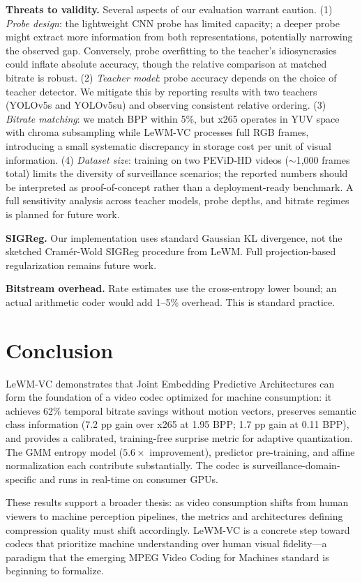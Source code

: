 \documentclass{article}
\begin{document}
\textbf{Threats to validity.} Several aspects of our evaluation warrant caution.
(1) \textit{Probe design}: the lightweight CNN probe has limited capacity; a deeper
probe might extract more information from both representations, potentially
narrowing the observed gap. Conversely, probe overfitting to the teacher's
idiosyncrasies could inflate absolute accuracy, though the relative comparison
at matched bitrate is robust. (2) \textit{Teacher model}: probe accuracy depends on
the choice of teacher detector. We mitigate this by reporting results with two
teachers (YOLOv5s and YOLOv5su) and observing consistent relative ordering.
(3) \textit{Bitrate matching}: we match BPP within 5\%, but x265 operates in
YUV space with chroma subsampling while LeWM-VC processes full RGB frames,
introducing a small systematic discrepancy in storage cost per unit of visual
information. (4) \textit{Dataset size}: training on two PEViD-HD videos (${\sim}$1,000
frames total) limits the diversity of surveillance scenarios; the reported
numbers should be interpreted as proof-of-concept rather than a deployment-ready
benchmark. A full sensitivity analysis across teacher models, probe depths, and
bitrate regimes is planned for future work.

\textbf{SIGReg.} Our implementation uses standard Gaussian KL divergence, not the sketched Cram\'{e}r-Wold SIGReg procedure from LeWM. Full projection-based regularization remains future work.

\textbf{Bitstream overhead.} Rate estimates use the cross-entropy lower bound; an actual arithmetic coder would add 1--5\% overhead. This is standard practice.

\section{Conclusion}

LeWM-VC demonstrates that Joint Embedding Predictive Architectures can form the foundation of a video codec optimized for machine consumption: it achieves 62\% temporal bitrate savings without motion vectors, preserves semantic class information (7.2 pp gain over x265 at 1.95 BPP; 1.7 pp gain at 0.11 BPP), and provides a calibrated, training-free surprise metric for adaptive quantization. The GMM entropy model ($5.6{\times}$ improvement), predictor pre-training, and affine normalization each contribute substantially. The codec is surveillance-domain-specific and runs in real-time on consumer GPUs.

These results support a broader thesis: as video consumption shifts from human viewers to machine perception pipelines, the metrics and architectures defining compression quality must shift accordingly. LeWM-VC is a concrete step toward codecs that prioritize machine understanding over human visual fidelity---a paradigm that the emerging MPEG Video Coding for Machines standard is beginning to formalize.
\end{document}
